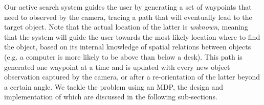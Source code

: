\documentclass[a4paper, twoside]{article}
\begin{document}
\noindent Our active search system guides the user by generating a set of waypoints that need to observed by the camera, tracing a path that will eventually lead to the target object. Note that the actual location of the latter is {\em unknown}, meaning that the system will guide the user towards the most likely location where to find the object, based on its internal knowledge of spatial relations between objects (e.g. a computer is more likely to be above than below a desk). This path is generated one waypoint at a time and is updated with every new object observation captured by the camera, or after a re-orientation of the latter beyond a certain angle. We tackle the problem using an MDP, the design and implementation of which are discussed in the following sub-sections. %



\end{document}
